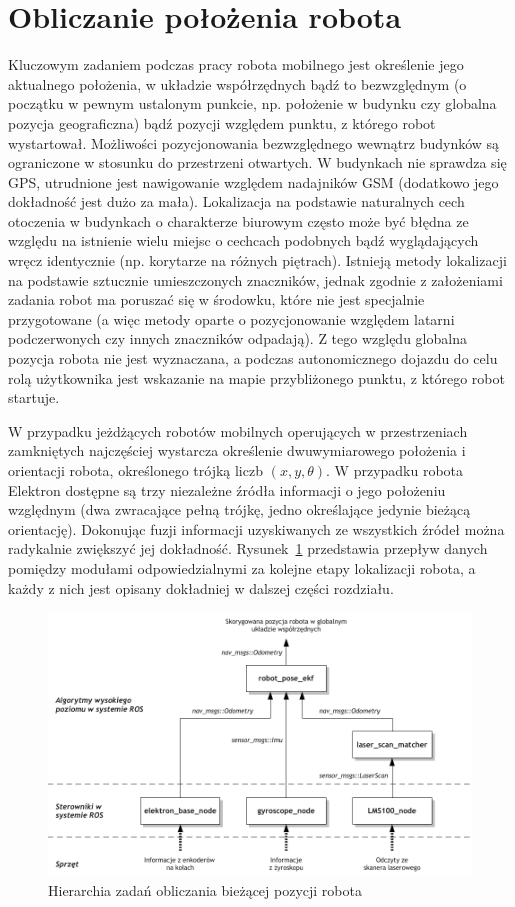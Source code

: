 \section{Obliczanie położenia robota}

Kluczowym zadaniem podczas pracy robota mobilnego jest określenie jego
aktualnego położenia, w układzie współrzędnych bądź to bezwzględnym (o początku
w pewnym ustalonym punkcie, np. położenie w budynku czy globalna pozycja
geograficzna) bądź pozycji względem punktu, z którego robot wystartował.
Możliwości pozycjonowania bezwzględnego wewnątrz budynków są ograniczone w
stosunku do przestrzeni otwartych. W budynkach nie sprawdza się GPS, utrudnione
jest nawigowanie względem nadajników GSM (dodatkowo jego dokładność jest dużo
za mała). Lokalizacja na podstawie naturalnych cech otoczenia w budynkach o
charakterze biurowym często może być błędna ze względu na istnienie wielu miejsc
o cechcach podobnych bądź wyglądających wręcz identycznie (np. korytarze na
różnych piętrach). Istnieją metody lokalizacji na podstawie sztucznie
umieszczonych znaczników, jednak zgodnie z założeniami zadania robot ma poruszać
się w środowku, które nie jest specjalnie przygotowane (a więc metody oparte o
pozycjonowanie względem latarni podczerwonych czy innych znaczników odpadają).
Z tego względu globalna pozycja robota nie jest wyznaczana, a podczas
autonomicznego dojazdu do celu rolą użytkownika jest wskazanie na mapie
przybliżonego punktu, z którego robot startuje.

W przypadku jeżdżących robotów mobilnych operujących w przestrzeniach
zamkniętych najczęściej wystarcza określenie dwuwymiarowego położenia i
orientacji robota, określonego trójką liczb $(x, y, \theta)$. W przypadku
robota Elektron dostępne są trzy niezależne źródła informacji o jego położeniu
względnym (dwa zwracające pełną trójkę, jedno określające jedynie bieżącą
orientację). Dokonując fuzji informacji uzyskiwanych ze wszystkich źródeł można
radykalnie zwiększyć jej dokładność. Rysunek~\ref{fig:diag_pos} przedstawia
przepływ danych pomiędzy modułami odpowiedzialnymi za kolejne etapy lokalizacji
robota, a każdy z nich jest opisany dokładniej w dalszej części rozdziału.

\begin{figure}[h!]
\centering
\includegraphics{../img/diag_position}
\caption{Hierarchia zadań obliczania bieżącej pozycji robota}
\label{fig:diag_pos}
\end{figure}

